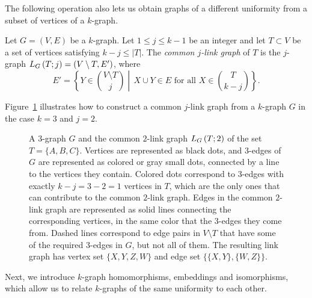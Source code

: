 The following operation also lets us obtain graphs of a
different uniformity from a subset of vertices of a $k$-graph.

\begin{definition} \label{def:link}
    Let $G = (V, E)$ be a $k$-graph.
    Let $1 \leq j \leq k - 1$ be an integer and let
    $T \subset V$ be a set of vertices satisfying $k - j \leq |T|$.
    The \emph{common $j$-link graph} of $T$ is the $j$-graph $L_{G}\left(T; j\right) = (V \setminus T, E')$, where
    \[
        E' = \left\{Y \in \binom{V \setminus T}{j}\middle\vert \, X \cup Y \in E \text{ for all } X \in \binom{T}{k-j}\right\}.
    \]
\end{definition}

Figure~\ref{fig:link} illustrates how to construct
a common $j$-link graph from a $k$-graph $G$ in the case $k=3$ and $j=2$.

\begin{figure}[ht]
    \centering
    
    \caption{A $3$-graph $G$ and the common $2$-link graph $L_{G}\left(T; 2\right)$ of the set $T = \{A, B, C\}$.
        Vertices are represented as black dots, and $3$-edges of $G$ are represented as colored or gray small dots,
        connected by a line to the vertices they contain.
        Colored dots correspond to $3$-edges with exactly
        $k - j = 3 - 2 = 1$ vertices in $T$, which are the only ones that can contribute to the common $2$-link graph.
        Edges in the common $2$-link graph are represented as solid lines connecting the corresponding vertices,
        in the same color that the $3$-edges they come from.
        Dashed lines correspond to edge pairs
        in $V \setminus T$ that have some of the required $3$-edges in $G$, but not all of them.
        The resulting link graph has vertex set $\{X, Y, Z, W\}$ and edge set
        $\{\{X, Y\}, \{W, Z\}\}$.
    }
    \label{fig:link}
\end{figure}

Next, we introduce $k$-graph homomorphisms, embeddings and isomorphisms, which allow us
to relate $k$-graphs of the same uniformity to each other.

